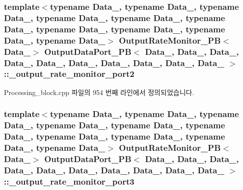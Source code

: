 \subsubsection[{\texorpdfstring{\+\_\+output\+\_\+rate\+\_\+monitor\+\_\+port2}{_output_rate_monitor_port2}}]{\setlength{\rightskip}{0pt plus 5cm}template$<$typename Data\+\_, typename Data\+\_, typename Data\+\_, typename Data\+\_, typename Data\+\_, typename Data\+\_, typename Data\+\_, typename Data\+\_, typename Data\+\_, typename Data\+\_$>$ {\bf Output\+Rate\+Monitor\+\_\+\+PB}$<$Data\+\_$>$ {\bf Output\+Data\+Port\+\_\+\+PB}$<$ Data\+\_, Data\+\_, Data\+\_, Data\+\_, Data\+\_, Data\+\_, Data\+\_, Data\+\_, Data\+\_, Data\+\_ $>$\+::\+\_\+output\+\_\+rate\+\_\+monitor\+\_\+port2\hspace{0.3cm}{\ttfamily [private]}}\hypertarget{classOutputDataPort__PB_a46dd27ed92cc254ac6898ecbafed5897}{}\label{classOutputDataPort__PB_a46dd27ed92cc254ac6898ecbafed5897}


Processing\+\_\+block.\+cpp 파일의 954 번째 라인에서 정의되었습니다.

\subsubsection[{\texorpdfstring{\+\_\+output\+\_\+rate\+\_\+monitor\+\_\+port3}{_output_rate_monitor_port3}}]{\setlength{\rightskip}{0pt plus 5cm}template$<$typename Data\+\_, typename Data\+\_, typename Data\+\_, typename Data\+\_, typename Data\+\_, typename Data\+\_, typename Data\+\_, typename Data\+\_, typename Data\+\_, typename Data\+\_$>$ {\bf Output\+Rate\+Monitor\+\_\+\+PB}$<$Data\+\_$>$ {\bf Output\+Data\+Port\+\_\+\+PB}$<$ Data\+\_, Data\+\_, Data\+\_, Data\+\_, Data\+\_, Data\+\_, Data\+\_, Data\+\_, Data\+\_, Data\+\_ $>$\+::\+\_\+output\+\_\+rate\+\_\+monitor\+\_\+port3\hspace{0.3cm}{\ttfamily [private]}}\hypertarget{classOutputDataPort__PB_a5822e1818001616cc37171b203ee6321}{}\label{classOutputDataPort__PB_a5822e1818001616cc37171b203ee6321}


